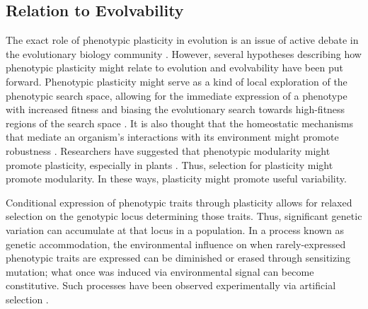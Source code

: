 




\subsection{Relation to Evolvability}

The exact role of phenotypic plasticity in evolution is an issue of active debate in the evolutionary biology community \cite{Pigliucci2008IsEvolvable}. However, several hypotheses describing how phenotypic plasticity might relate to evolution and evolvability have been put forward. Phenotypic plasticity might serve as a kind of local exploration of the phenotypic search space, allowing for the immediate expression of a phenotype with increased fitness and biasing the evolutionary search towards high-fitness regions of the search space \cite{Downing2012HeterochronousBaldwinism}. It is also thought that the homeostatic mechanisms that mediate an organism's interactions with its environment might promote robustness \cite{Moczek2011TheInnovation}. Researchers have suggested that phenotypic modularity might promote plasticity, especially in plants \cite{Schlichting1986ThePlants, DeKroon2005APlants}. Thus, selection for plasticity might promote modularity. In these ways, plasticity might promote useful variability.

Conditional expression of phenotypic traits through plasticity allows for relaxed selection on the genotypic locus determining those traits. Thus, significant genetic variation can accumulate at that locus in a population. In a process known as genetic accommodation, the environmental influence on when rarely-expressed phenotypic traits are expressed can be diminished or erased through sensitizing mutation; what once was induced via environmental signal can become constitutive. Such processes have been observed experimentally via artificial selection \cite{Moczek2011TheInnovation}.

